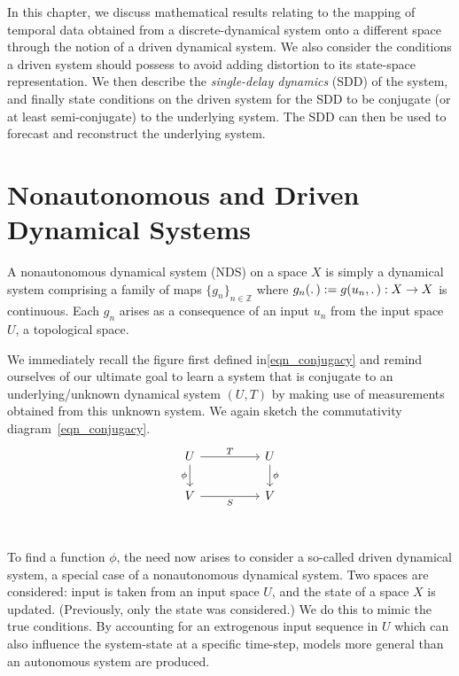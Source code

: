 In this chapter, we discuss mathematical results relating to the mapping of temporal data obtained from a discrete-dynamical system onto a different space through the notion of a driven dynamical system. 
We also consider the conditions a driven system should possess to avoid adding distortion to its state-space representation. 
We then describe the \emph{single-delay dynamics} (SDD) of the system, and finally state conditions on the driven system for the SDD to be conjugate (or at least semi-conjugate) to the underlying system. 
The SDD can then be used to forecast and reconstruct the underlying system. 

\section{Nonautonomous and Driven Dynamical Systems}

\begin{Definition}
  \label{Dfn_NDS}\rm
  A nonautonomous dynamical system (NDS) on a space $X$ is simply a dynamical system comprising a family of maps ${\{g_n\}}_{n \in \mathbb{Z}}$ where $g_n(\ldotp):=g(u_n,\ldotp):X\to{X}$ is continuous. Each $g_n$ arises as a consequence of an input $u_n$ from the input space $U$, a topological space. 
\end{Definition}

We immediately recall the figure first defined in\eqref{eqn_conjugacy}  and remind ourselves of our ultimate goal to learn a system that is conjugate to an underlying/unknown dynamical system $(U,T)$ by making use of measurements obtained from  this unknown system. 
We again sketch the commutativity diagram~\ref{eqn_conjugacy}.
\begin{equation*}\label{UV_conjugacy}
  \begin{tikzcd}
    U && U \\
    V && V \\
    \arrow["T", from=1-1, to=1-3]
    \arrow["\phi", from=1-3, to=2-3]
    \arrow["\phi"', from=1-1, to=2-1]
    \arrow["S"', from=2-1, to=2-3]
  \end{tikzcd}
  \end{equation*}

To find a function $\phi$, the need now arises to consider a so-called driven dynamical system, a special case of a nonautonomous dynamical system. 
Two spaces are considered: input is taken from an input space $U$, and the state of a space $X$ is updated. (Previously, only the state was considered.)
We do this to mimic the true conditions. By accounting for an extrogenous input sequence in $U$ which can also influence the  system-state at a specific time-step, models more general than an autonomous system are produced.


